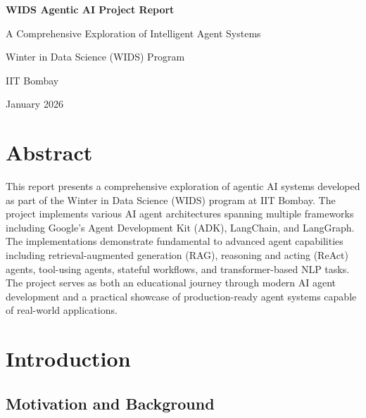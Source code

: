 \documentclass[12pt,a4paper]{article}
\begin{document}
\begin{titlepage}
    \centering
    \vspace*{2cm}
    
    {\huge\bfseries WIDS Agentic AI Project Report\par}
    \vspace{1.5cm}
    
    {\Large A Comprehensive Exploration of Intelligent Agent Systems\par}
    \vspace{2cm}
    
    {\large Winter in Data Science (WIDS) Program\par}
    {\large IIT Bombay\par}
    \vspace{2cm}
    
    {\large January 2026\par}
    
    \vfill
\end{titlepage}

\tableofcontents
\newpage

\section{Abstract}

This report presents a comprehensive exploration of agentic AI systems developed as part of the Winter in Data Science (WIDS) program at IIT Bombay. The project implements various AI agent architectures spanning multiple frameworks including Google's Agent Development Kit (ADK), LangChain, and LangGraph. The implementations demonstrate fundamental to advanced agent capabilities including retrieval-augmented generation (RAG), reasoning and acting (ReAct) agents, tool-using agents, stateful workflows, and transformer-based NLP tasks. The project serves as both an educational journey through modern AI agent development and a practical showcase of production-ready agent systems capable of real-world applications.

\section{Introduction}

\subsection{Motivation and Background}
\end{document}
